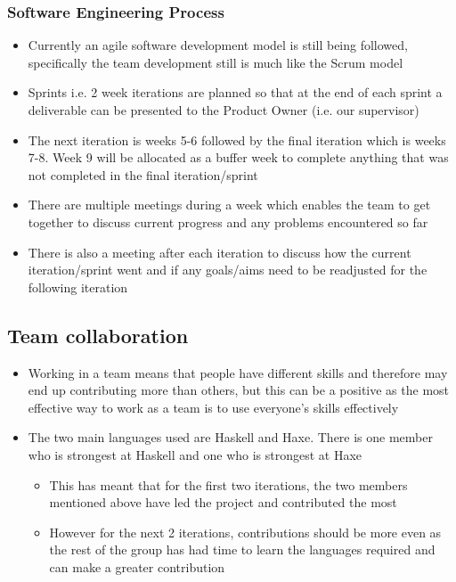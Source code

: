 \documentclass[12pt]{article}
\begin{document}
\subsubsection{Software Engineering Process}
\begin{itemize}
\item Currently an agile software development model is still being followed,
specifically the team development still is much like the Scrum model
\item Sprints i.e. 2 week iterations are planned so that at the end of each
sprint a deliverable can be presented to the Product Owner (i.e. our
supervisor)
\item The next iteration is weeks 5-6 followed by the final iteration which
is weeks 7-8. Week 9 will be allocated as a buffer week to complete
anything that was not completed in the final iteration/sprint
\item There are multiple meetings during a week which enables the team to
get together to discuss current progress and any problems encountered
so far
\item There is also a meeting after each iteration to discuss how the current
iteration/sprint went and if any goals/aims need to be readjusted
for the following iteration
\end{itemize}


\subsection{Team collaboration}

\begin{itemize}
\item Working in a team means that people have different skills and therefore
may end up contributing more than others, but this can be a positive
as the most effective way to work as a team is to use everyone's skills
effectively
\item The two main languages used are Haskell and Haxe. There is one member
who is strongest at Haskell and one who is strongest at Haxe

\begin{itemize}
\item This has meant that for the first two iterations, the two members
mentioned above have led the project and contributed the most
\item However for the next 2 iterations, contributions should be more even
as the rest of the group has had time to learn the languages required
and can make a greater contribution
\end{itemize}
\end{itemize}
\end{document}
